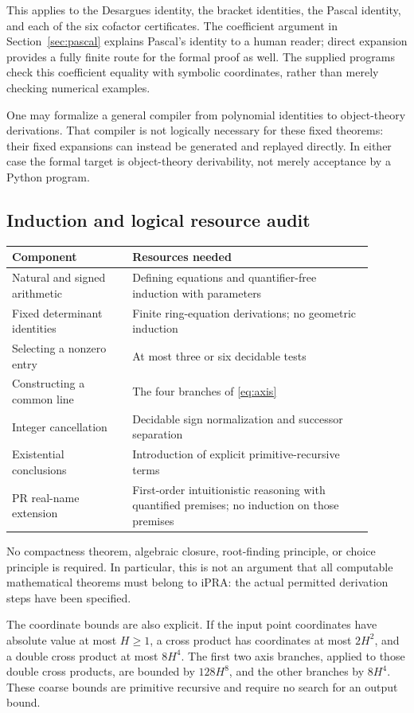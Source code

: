This applies to the Desargues identity, the bracket identities, the
Pascal identity, and each of the six cofactor certificates. The
coefficient argument in Section~\ref{sec:pascal} explains Pascal's
identity to a human reader; direct expansion provides a fully finite
route for the formal proof as well. The supplied programs check this
coefficient equality with symbolic coordinates, rather than merely
checking numerical examples.

One may formalize a general compiler from polynomial identities to
object-theory derivations. That compiler is not logically necessary for
these fixed theorems: their fixed expansions can instead be generated
and replayed directly. In either case the formal target is
object-theory derivability, not merely acceptance by a Python program.

\subsection{Induction and logical resource audit}
\begin{center}
\begin{tabular}{p{0.30\linewidth}p{0.60\linewidth}}
\toprule
Component & Resources needed\\
\midrule
Natural and signed arithmetic & Defining equations and quantifier-free induction with parameters\\
Fixed determinant identities & Finite ring-equation derivations; no geometric induction\\
Selecting a nonzero entry & At most three or six decidable tests\\
Constructing a common line & The four branches of \eqref{eq:axis}\\
Integer cancellation & Decidable sign normalization and successor separation\\
Existential conclusions & Introduction of explicit primitive-recursive terms\\
PR real-name extension & First-order intuitionistic reasoning with quantified premises; no induction on those premises\\
\bottomrule
\end{tabular}
\end{center}

No compactness theorem, algebraic closure, root-finding principle, or
choice principle is required. In particular, this is not an argument
that all computable mathematical theorems must belong to iPRA: the actual
permitted derivation steps have been specified.

The coordinate bounds are also explicit. If the input point coordinates
have absolute value at most $H\ge1$, a cross product has coordinates at
most $2H^2$, and a double cross product at most $8H^4$. The first two
axis branches, applied to those double cross products, are bounded by
$128H^8$, and the other branches by $8H^4$. These coarse bounds are
primitive recursive and require no search for an output bound.

